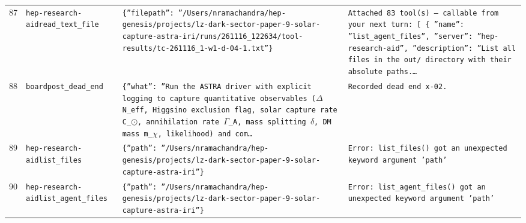 \documentclass[11pt,a4paper]{article}
\begin{document}
\begin{longtable}{@{}p{}p{}p{}p{}@{}}
87 & \texttt{hep-research-aid}\newline\texttt{read\_\allowbreak{}text\_\allowbreak{}file} & \texttt{\{''filepath'':\allowbreak{} ''/\allowbreak{}Users/\allowbreak{}nramachandra/\allowbreak{}hep-genesis/\allowbreak{}projects/\allowbreak{}lz-dark-sector-paper-9-solar-capture-astra-iri/\allowbreak{}runs/\allowbreak{}261116\_\allowbreak{}122634/\allowbreak{}tool-results/\allowbreak{}tc-261116\_\allowbreak{}1-w1-d-04-1.txt''\}\allowbreak{}} & \texttt{Attached 83 tool(s)\allowbreak{} --- callable from your next turn:\allowbreak{} [  \{   ''name'':\allowbreak{} ''list\_\allowbreak{}agent\_\allowbreak{}files'',\allowbreak{}   ''server'':\allowbreak{} ''hep-research-aid'',\allowbreak{}   ''description'':\allowbreak{} ''List all files in the out/\allowbreak{} directory with their absolute paths.\ldots{}\allowbreak{}} \\
88 & \texttt{board}\newline\texttt{post\_\allowbreak{}dead\_\allowbreak{}end} & \texttt{\{''what'':\allowbreak{} ''Run the ASTRA driver with explicit logging to capture quantitative observables ($\Delta$N\_\allowbreak{}eff,\allowbreak{} Higgsino exclusion flag,\allowbreak{} solar capture rate C\_\allowbreak{}$\odot$,\allowbreak{} annihilation rate $\Gamma$\_\allowbreak{}A,\allowbreak{} mass splitting $\delta$,\allowbreak{} DM mass m\_\allowbreak{}$\chi$,\allowbreak{} likelihood)\allowbreak{} and com\ldots{}\allowbreak{}} & \texttt{Recorded dead end x-02.} \\
89 & \texttt{hep-research-aid}\newline\texttt{list\_\allowbreak{}files} & \texttt{\{''path'':\allowbreak{} ''/\allowbreak{}Users/\allowbreak{}nramachandra/\allowbreak{}hep-genesis/\allowbreak{}projects/\allowbreak{}lz-dark-sector-paper-9-solar-capture-astra-iri''\}\allowbreak{}} & \texttt{Error:\allowbreak{} list\_\allowbreak{}files()\allowbreak{} got an unexpected keyword argument 'path'} \\
90 & \texttt{hep-research-aid}\newline\texttt{list\_\allowbreak{}agent\_\allowbreak{}files} & \texttt{\{''path'':\allowbreak{} ''/\allowbreak{}Users/\allowbreak{}nramachandra/\allowbreak{}hep-genesis/\allowbreak{}projects/\allowbreak{}lz-dark-sector-paper-9-solar-capture-astra-iri''\}\allowbreak{}} & \texttt{Error:\allowbreak{} list\_\allowbreak{}agent\_\allowbreak{}files()\allowbreak{} got an unexpected keyword argument 'path'} \\

\end{longtable}
\end{document}
